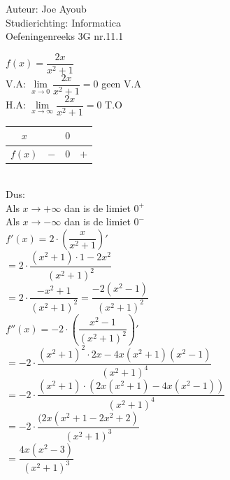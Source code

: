 \documentclass[a4paper]{article}
\begin{document}
  
\noindent \large Auteur: Joe Ayoub \\
\noindent \large Studierichting: Informatica\\
\noindent \large Oefeningenreeks 3G nr.11.1 \\

\medskip

\normalsize


$f(x)  = \dfrac{2x}{x^2 + 1}$ \\

V.A: $\lim\limits_{x \rightarrow 0} \dfrac{2x}{x^2 + 1} = 0$  geen V.A \\

H.A: $\lim\limits_{x \rightarrow \infty} \dfrac{2x}{x^2 + 1} = 0$  T.O \\

\begin{tabular}{c|ccc}
	$x$ &  & $0$ & \\ \hline
	$f(x)$ & $-$ & $0$ & $+$ \\
\end{tabular} \\

Dus: \\
Als $x \rightarrow +\infty$ dan is de limiet $0^+$ \\
Als $x \rightarrow -\infty$ dan is de limiet $0^-$ \\

$f'(x) = 2 \cdot \left(\dfrac{x}{x^2 + 1 }\right)'$ \\

$ = 2 \cdot \dfrac{(x^2 + 1) \cdot 1 - 2x^2}{(x^2 + 1)^2}$ \\

$ = 2 \cdot \dfrac{-x^2 + 1}{(x^2 + 1)^2} = \dfrac{-2(x^2 - 1)}{(x^2 + 1)^2}$ \\


$f''(x) = -2 \cdot \left(\dfrac{x^2 - 1}{(x^2 + 1)^2}\right)'$ \\

$ = -2 \cdot \dfrac{(x^2 + 1)^2 \cdot 2x - 4x(x^2 + 1)(x^2 - 1)}{(x^2 + 1)^4}$ \\

$ = -2 \cdot \dfrac{(x^2 + 1) \cdot (2x(x^2 + 1) - 4x(x^2 - 1))}{(x^2 + 1)^4}$ \\

$ = -2 \cdot \dfrac{(2x(x^2 + 1 - 2x^2 + 2)}{(x^2 + 1)^3}$ \\

$ = \dfrac{4x(x^2 - 3)}{(x^2 + 1)^3}$ \\ \\
\end{document}
